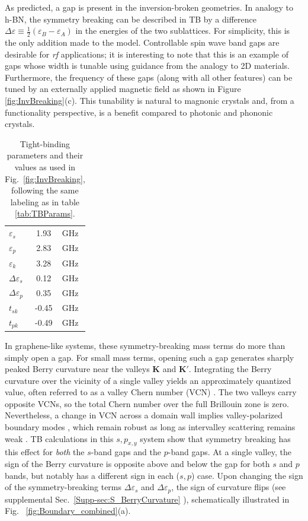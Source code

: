 \documentclass[aps,prx,twocolumn,superscriptaddress,floatfix]{revtex4-2}
\begin{document}
As predicted, a gap is present in the inversion-broken geometries. In analogy to h-BN, the symmetry breaking can be described in TB by a difference $\Delta\varepsilon\equiv\frac{1}{2} \left( \varepsilon_B-\varepsilon_A \right)$ in the energies of the two sublattices. For simplicity, this is the only addition made to the model. Controllable spin wave band gaps are desirable for {\em rf} applications; it is interesting to note that this is an example of gaps whose width is tunable using guidance from the analogy to 2D materials. Furthermore, the frequency of these gaps (along with all other features) can be tuned by an externally applied magnetic field as shown in Figure \ref{fig:InvBreaking}(c). This tunability is natural to magnonic crystals and, from a functionality perspective, is a benefit compared to photonic and phononic crystals.
\begin{table}
\begin{tabular}{|l|c l |}
    
    \hline
    $\varepsilon_s$ & 1.93 & GHz\\
    $\varepsilon _p$ & 2.83& GHz\\ 
    $\varepsilon _k$ & 3.28& GHz\\
    \hline
    $\Delta\varepsilon_s$ & 0.12 & GHz\\
    $\Delta\varepsilon_p$ & 0.35 & GHz\\
    \hline
    $t_{sk}$ &-0.45 & GHz\\
    $t_{pk}$ & -0.49& GHz\\
    \hline
    
\end{tabular}
\caption{Tight-binding parameters and their values as used in Fig.~\ref{fig:InvBreaking}, following the same labeling as in table \ref{tab:TBParams}.}
\label{tab:TBParams_Invbroken}
\end{table}

In graphene-like systems, these symmetry-breaking mass terms do more than simply open a gap. For small mass terms, opening such a gap generates sharply peaked Berry curvature near the valleys $\mathbf{K}$ and $\mathbf{K'}$. Integrating the Berry curvature over the vicinity of a single valley yields an approximately quantized value, often referred to as a valley Chern number (VCN) \cite{zhang_valley_2013}. The two valleys carry opposite VCNs, so the total Chern number over the full Brillouin zone is zero. Nevertheless, a change in VCN across a domain wall implies valley-polarized boundary modes \cite{semenoff_domain_2008, jung_valley-hall_2011}, which remain robust as long as intervalley scattering remains weak \cite{zhang_valley_2013}. TB calculations in this $s,p_{x,y}$ system show that symmetry breaking has this effect for \textit{both} the $s$-band gaps and the $p$-band gaps. At a single valley, the sign of the Berry curvature is opposite above and below the gap for both $s$ and $p$ bands, but notably has a different sign in each ($s,p$) case. Upon changing the sign of the symmetry-breaking terms $\Delta\varepsilon_s$ and $\Delta\varepsilon_p$, the sign of curvature flips (see supplemental Sec.~\ref{Supp-sec:S_BerryCurvature} \cite{Supplemental}), schematically illustrated in Fig. ~\ref{fig:Boundary_combined}(a). 
\end{document}
